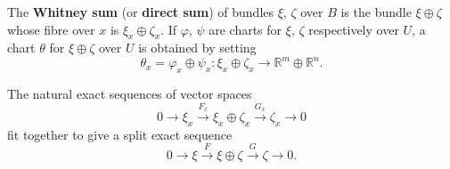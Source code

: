 The \textbf{Whitney sum} (or \textbf{direct sum}) of bundles $\xi$, $\zeta$ over $B$ is the bundle $\xi \oplus \zeta$ whose fibre over $x$ is $\xi_x \oplus \zeta_x$. If $\varphi$, $\psi$ are charts for $\xi$, $\zeta$ respectively over $U$, a chart $\theta$ for $\xi \oplus \zeta$ over $U$ is obtained by setting
$$\theta_x = \varphi_x \oplus \psi_x: \xi_x \oplus \zeta_x \to \mathbb{R}^m \oplus \mathbb{R}^n.$$

The natural exact sequences of vector spaces
$$0 \to \xi_x \xrightarrow{F_x} \xi_x \oplus \zeta_x \xrightarrow{G_x} \zeta_x \to 0$$
fit together to give a split exact sequence
$$0 \to \xi \xrightarrow{F} \xi \oplus \zeta \xrightarrow{G} \zeta \to 0.$$
